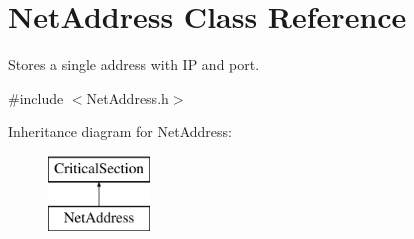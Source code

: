 \hypertarget{class_net_address}{
\section{NetAddress Class Reference}
\label{class_net_address}
}


Stores a single address with IP and port.  




{\ttfamily \#include $<$NetAddress.h$>$}

Inheritance diagram for NetAddress:\begin{figure}[H]
\begin{center}
\leavevmode
\includegraphics[height=2.000000cm]{class_net_address}
\end{center}
\end{figure}
